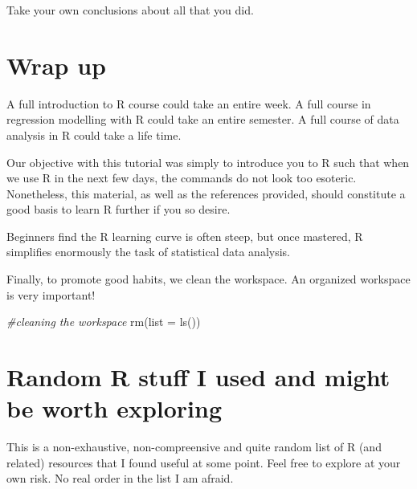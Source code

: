 \documentclass[
]{article}
\newenvironment{Shaded}{\begin{snugshade}}{\end{snugshade}}
\newcommand{\AttributeTok}[1]{\textcolor[rgb]{0.77,0.63,0.00}{#1}}
\newcommand{\CommentTok}[1]{\textcolor[rgb]{0.56,0.35,0.01}{\textit{#1}}}
\newcommand{\FunctionTok}[1]{\textcolor[rgb]{0.00,0.00,0.00}{#1}}
\newcommand{\NormalTok}[1]{#1}
\begin{document}
Take your own conclusions about all that you did.

\hypertarget{wrap-up}{%
\section{Wrap up}\label{wrap-up}}

A full introduction to R course could take an entire week. A full course
in regression modelling with R could take an entire semester. A full
course of data analysis in R could take a life time.

Our objective with this tutorial was simply to introduce you to R such
that when we use R in the next few days, the commands do not look too
esoteric. Nonetheless, this material, as well as the references
provided, should constitute a good basis to learn R further if you so
desire.

Beginners find the R learning curve is often steep, but once mastered, R
simplifies enormously the task of statistical data analysis.

Finally, to promote good habits, we clean the workspace. An organized
workspace is very important!

\begin{Shaded}
\begin{Highlighting}[]
\CommentTok{\#cleaning the workspace}
\FunctionTok{rm}\NormalTok{(}\AttributeTok{list =} \FunctionTok{ls}\NormalTok{())}
\end{Highlighting}
\end{Shaded}

\hypertarget{random-r-stuff-i-used-and-might-be-worth-exploring}{%
\section{Random R stuff I used and might be worth
exploring}\label{random-r-stuff-i-used-and-might-be-worth-exploring}}

This is a non-exhaustive, non-compreensive and quite random list of R
(and related) resources that I found useful at some point. Feel free to
explore at your own risk. No real order in the list I am afraid.
\end{document}
